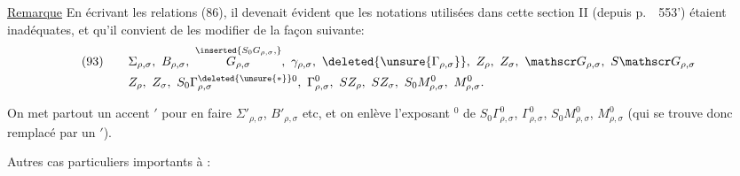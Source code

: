 \uline{Remarque} En écrivant les relations (86), il devenait évident que les notations utilisées dans cette section II (depuis p.\ \ 553') étaient inadéquates, et qu'il convient de les modifier de la façon suivante:
\[
\begin{aligned}
(93)\qquad&\Sigma_{\rho,\sigma},\ B_{\rho,\sigma},\
\overset{\inserted{S_0G_{\rho,\sigma},}}{G_{\rho,\sigma}},\
\gamma_{\rho,\sigma},\ \deleted{\unsure{\Gamma_{\rho,\sigma}}},\
Z_\rho,\ Z_\sigma,\ \mathscr G_{\rho,\sigma},\ S\mathscr G_{\rho,\sigma}\\
&Z_\rho,\ Z_\sigma,\ S_0\Gamma_{\rho,\sigma}^{\deleted{\unsure{*}}0},\
\Gamma_{\rho,\sigma}^0,\ SZ_\rho,\ SZ_\sigma,\ S_0M_{\rho,\sigma}^0,\ M_{\rho,\sigma}^0.
\end{aligned}
\]

On met partout un accent $'$ pour en faire $\Sigma'_{\rho,\sigma}$, $B'_{\rho,\sigma}$ etc, et on enlève l'exposant $^0$ de $S_0\Gamma_{\rho,\sigma}^0$, $\Gamma_{\rho,\sigma}^0$, $S_0M_{\rho,\sigma}^0$, $M_{\rho,\sigma}^0$ (qui se trouve donc remplacé par un $'$).

Autres cas particuliers importants à :

